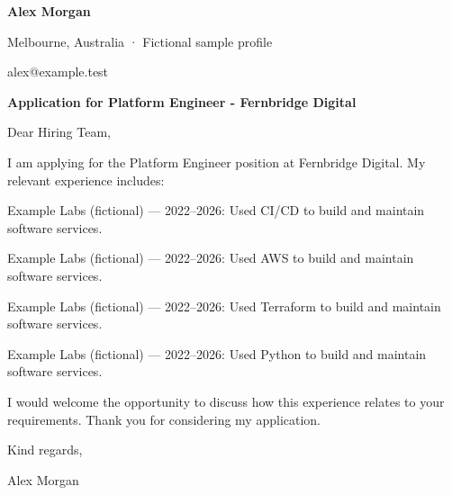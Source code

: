 \documentclass[10pt,a4paper]{article}
\begin{document}
{\LARGE\bfseries\color{navy} Alex Morgan}\par
Melbourne, Australia · Fictional sample profile\par
alex@example.test\par
{\large\bfseries\color{navy} Application for Platform Engineer - Fernbridge Digital}\par
Dear Hiring Team,\par
I am applying for the Platform Engineer position at Fernbridge Digital. My relevant experience includes:\par
Example Labs (fictional) — 2022–2026: Used CI/CD to build and maintain software services.\par
Example Labs (fictional) — 2022–2026: Used AWS to build and maintain software services.\par
Example Labs (fictional) — 2022–2026: Used Terraform to build and maintain software services.\par
Example Labs (fictional) — 2022–2026: Used Python to build and maintain software services.\par
I would welcome the opportunity to discuss how this experience relates to your requirements. Thank you for considering my application.\par
Kind regards,\par
Alex Morgan\par
\end{document}

